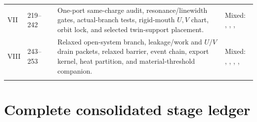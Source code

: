 {\begin{longtable}{@{}L{0.08\textwidth}L{0.14\textwidth}L{0.17\textwidth}L{0.35\textwidth}L{0.20\textwidth}@{}}
\addlinespace
VII & 219--242 &  & One-port same-charge audit, resonance/linewidth gates, actual-branch tests, rigid-mouth \(U,V\) chart, orbit lock, and selected twin-support placement. & Mixed: \StatusExactClosure{}, \StatusReduced{}, \StatusNumerical{}, \StatusOpen{} \\
\addlinespace
VIII & 243--253 &  & Relaxed open-system branch, leakage/work and \(U/V\) drain packets, relaxed barrier, event chain, export kernel, heat partition, and material-threshold companion. & Mixed: \StatusExactClosure{}, \StatusReduced{}, \StatusEffective{}, \StatusNumerical{}, \StatusOpen{} \\
\addlinespace
\bottomrule
\end{longtable}
}

\section{Complete consolidated stage ledger}
\label{sec:stage-ledger-consolidated}

